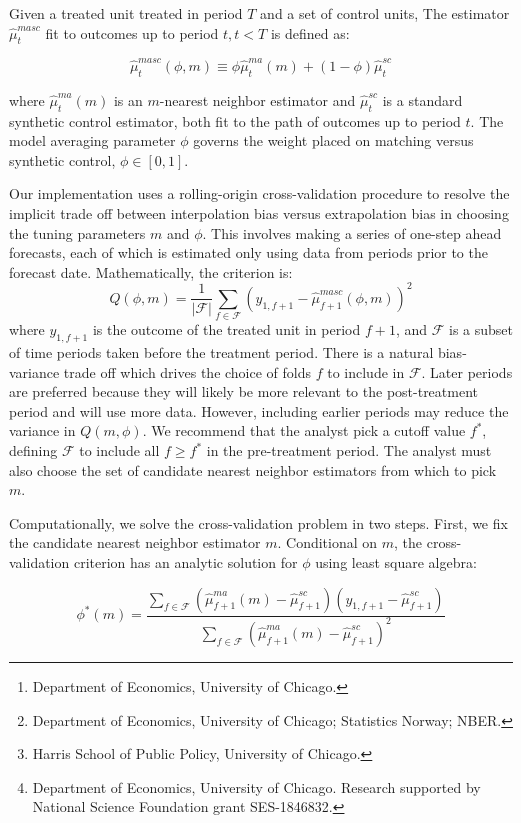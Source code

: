 \documentclass[letterpaper, 12pt]{article}
\title{\MYTITLE}
\author{
    Maxwell Kellogg\thanks{
        Department of Economics, University of Chicago.
    }
    \qquad
    Magne Mogstad\thanks{
        Department of Economics, University of Chicago; Statistics Norway; NBER.
    }\\[3mm]
    \;\,
    Guillaume A. Pouliot\thanks{
        Harris School of Public Policy, University of Chicago.
    }
    \qquad
    Alexander Torgovitsky\thanks{
        Department of Economics, University of Chicago.
        Research supported by National Science Foundation grant SES-1846832.
    }
}
\theoremstyle{definition}
\begin{document}
\maketitle


Given a treated unit treated in period $T$ and a set of control units,
The estimator $\hat{\mu}_t^{masc}$ fit to outcomes up to period $t, t<T$ is defined as:

$$\hat{\mu}_t^{masc}(\phi,m) \equiv \phi \hat{\mu}_t^{ma}(m) + (1-\phi)\hat{\mu}_t^{sc}$$

where $\hat{\mu}_t^{ma}(m)$ is an $m$-nearest neighbor estimator and  $\hat{\mu}_t^{sc}$
is a standard synthetic control estimator, both fit to the path of outcomes up to period $t$.
The model averaging parameter $\phi$ governs the weight placed on matching versus synthetic control,
$\phi \in [0,1]$.\

Our implementation uses a rolling-origin cross-validation procedure to  resolve the implicit
trade off between interpolation bias versus extrapolation bias in choosing the tuning parameters
$m$ and $\phi$. This involves making a series of one-step ahead forecasts, each of which is 
estimated only using data from periods prior to the forecast date. Mathematically, the criterion is:
$$Q(\phi,m) = \frac{1}{|\mathcal{F}|}\sum_{f \in \mathcal{F}} (y_{1,f+1} - \hat{\mu}_{f+1}^{masc}(\phi,m))^2 $$
where $y_{1,f+1}$ is the outcome of the treated unit in period $f+1$, and $\mathcal{F}$ is a subset of time periods
taken before the treatment period. There is a natural bias-variance trade off which drives the choice of folds $f$
to include in $\mathcal{F}$. Later periods are preferred because they will likely be more relevant to the post-treatment
period and will use more data. However, including earlier periods may reduce the variance in $Q(m,\phi)$. We recommend
that the analyst pick a cutoff value $f^*$, defining $\mathcal{F}$ to include all $f \ge f^*$ in the pre-treatment period.
The analyst must also choose the set of candidate nearest neighbor estimators from which to pick $m$.\

Computationally, we solve the cross-validation problem in two steps. First, we fix the candidate nearest neighbor estimator $m$.
Conditional on $m$, the cross-validation criterion has an analytic solution for $\phi$ using least square algebra:

$$\phi^*(m) = \frac{\sum_{f\in\mathcal{F}} (\hat{\mu}^{ma}_{f+1}(m)-\hat{\mu}^{sc}_{f+1})(y_{1,f+1}-\hat{\mu}_{f+1}^{sc})}{\sum_{f\in\mathcal{F}} (\hat{\mu}_{f+1}^{ma}(m)-\hat{\mu}_{f+1}^{sc})^2}$$
\end{document}
